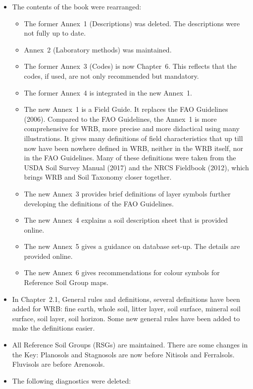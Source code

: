 \documentclass[
  letterpaper,
  DIV=11,
  numbers=noendperiod]{scrreprt}
\providecommand{\tightlist}{%
  \setlength{\itemsep}{0pt}\setlength{\parskip}{0pt}}\usepackage{longtable,booktabs,array}
\begin{document}
\begin{itemize}
\item
  The contents of the book were rearranged:

  \begin{itemize}
  \tightlist
  \item
    The former Annex~1 (Descriptions) was deleted. The descriptions were
    not fully up to date.
  \item
    Annex~2 (Laboratory methods) was maintained.
  \item
    The former Annex~3 (Codes) is now Chapter~6. This reflects that the
    codes, if used, are not only recommended but mandatory.
  \item
    The former Annex~4 is integrated in the new Annex~1.
  \item
    The new Annex~1 is a Field Guide. It replaces the FAO Guidelines
    (2006). Compared to the FAO Guidelines, the Annex~1 is more
    comprehensive for WRB, more precise and more didactical using many
    illustrations. It gives many definitions of field characteristics
    that up till now have been nowhere defined in WRB, neither in the
    WRB itself, nor in the FAO Guidelines. Many of these definitions
    were taken from the USDA Soil Survey Manual (2017) and the NRCS
    Fieldbook (2012), which brings WRB and Soil Taxonomy closer
    together.
  \item
    The new Annex~3 provides brief definitions of layer symbols further
    developing the definitions of the FAO Guidelines.
  \item
    The new Annex~4 explains a soil description sheet that is provided
    online.
  \item
    The new Annex~5 gives a guidance on database set-up. The details are
    provided online.
  \item
    The new Annex~6 gives recommendations for colour symbols for
    Reference Soil Group maps.
  \end{itemize}
\item
  In Chapter~2.1, General rules and definitions, several definitions
  have been added for WRB: fine earth, whole soil, litter layer, soil
  surface, mineral soil surface, soil layer, soil horizon. Some new
  general rules have been added to make the definitions easier.
\item
  All Reference Soil Groups (RSGs) are maintained. There are some
  changes in the Key: Planosols and Stagnosols are now before Nitisols
  and Ferralsols. Fluvisols are before Arenosols.
\item
  The following diagnostics were deleted:


\end{itemize}
\end{document}
